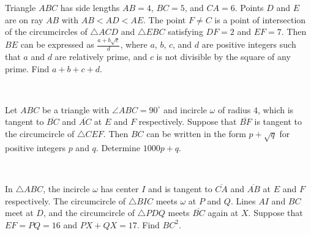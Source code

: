 \documentclass[mast]{lucky}
\begin{document}
\begin{req}[AIME I 2019/13]{9}
Triangle $ABC$ has side lengths $AB=4$, $BC=5$, and $CA=6$. Points $D$ and $E$ are on ray $AB$ with $AB<AD<AE$. The point $F \neq C$ is a point of intersection of the circumcircles of $\triangle ACD$ and $\triangle EBC$ satisfying $DF=2$ and $EF=7$. Then $BE$ can be expressed as $\tfrac{a+b\sqrt{c}}{d}$, where $a$, $b$, $c$, and $d$ are positive integers such that $a$ and $d$ are relatively prime, and $c$ is not divisible by the square of any prime. Find $a+b+c+d$.
\end{req}\\
\begin{prob}{9}
Let $ABC$ be a triangle with $\angle ABC = 90^\circ$ and incircle $\omega$ of radius $4$, which is tangent to $\overline{BC}$ and $\overline{AC}$ at $E$ and $F$ respectively. Suppose that $\overline{BF}$ is tangent to the circumcircle of $\triangle CEF$. Then $BC$ can be written in the form $p + \sqrt{q}$ for positive integers $p$ and $q$. Determine $1000p + q$.
\end{prob}\\
\begin{prob}{13}
In $\triangle ABC$, the incircle $\omega$ has center $I$ and is tangent to $\overline{CA}$ and $\overline{AB}$ at $E$ and $F$ respectively. The circumcircle of $\triangle{BIC}$ meets $\omega$ at $P$ and $Q$. Lines $AI$ and $BC$ meet at $D$, and the circumcircle of $\triangle PDQ$ meets $\overline{BC}$ again at $X$. Suppose that $EF = PQ = 16$ and $PX + QX = 17$. Find $BC^2$.
\end{prob}
\end{document}
